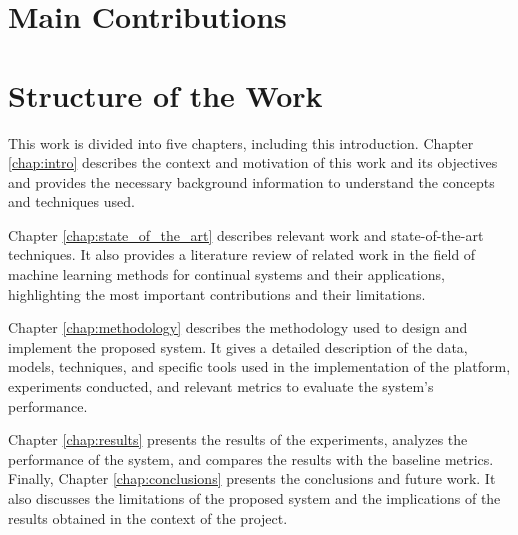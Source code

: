 \documentclass[../main.tex]{subfiles}
\begin{document}
    \clearpage

    \section{Main Contributions} \label{sec:main_contributions}

    \section{Structure of the Work} \label{sec:structure_of_the_work}

    This work is divided into five chapters, including this introduction. Chapter \ref{chap:intro} describes the context and motivation of this work and its objectives and provides the necessary background information to understand the concepts and techniques used. 
    
    Chapter \ref{chap:state_of_the_art} describes relevant work and state-of-the-art techniques. It also provides a literature review of related work in the field of machine learning methods for continual systems and their applications, highlighting the most important contributions and their limitations.

    Chapter \ref{chap:methodology} describes the methodology used to design and implement the proposed system.  It gives a detailed description of the data, models, techniques, and specific tools used in the implementation of the platform, experiments conducted, and relevant metrics to evaluate the system's performance.
    
    Chapter \ref{chap:results} presents the results of the experiments, analyzes the performance of the system, and compares the results with the baseline metrics. Finally, Chapter \ref{chap:conclusions} presents the conclusions and future work. It also discusses the limitations of the proposed system and the implications of the results obtained in the context of the project.

    
    

\end{document}
